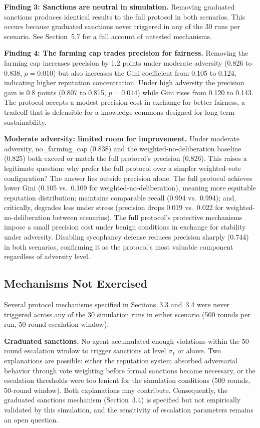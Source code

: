 \documentclass[11pt]{article}
\begin{document}
\textbf{Finding 3: Sanctions are neutral in simulation.} Removing graduated sanctions produces identical results to the full protocol in both scenarios. This occurs because graduated sanctions never triggered in any of the 30 runs per scenario. See Section~5.7 for a full account of untested mechanisms.

\textbf{Finding 4: The farming cap trades precision for fairness.} Removing the farming cap increases precision by 1.2 points under moderate adversity (0.826 to 0.838, $p = 0.010$) but also increases the Gini coefficient from 0.105 to 0.124, indicating higher reputation concentration. Under high adversity the precision gain is 0.8 points (0.807 to 0.815, $p = 0.014$) while Gini rises from 0.120 to 0.143. The protocol accepts a modest precision cost in exchange for better fairness, a tradeoff that is defensible for a knowledge commons designed for long-term sustainability.

\textbf{Moderate adversity: limited room for improvement.} Under moderate adversity, no\_farming\_cap (0.838) and the weighted-no-deliberation baseline (0.825) both exceed or match the full protocol's precision (0.826). This raises a legitimate question: why prefer the full protocol over a simpler weighted-vote configuration? The answer lies outside precision alone. The full protocol achieves lower Gini (0.105 vs.\ 0.109 for weighted-no-deliberation), meaning more equitable reputation distribution; maintains comparable recall (0.994 vs.\ 0.994); and, critically, degrades less under stress (precision drops 0.019 vs.\ 0.022 for weighted-no-deliberation between scenarios). The full protocol's protective mechanisms impose a small precision cost under benign conditions in exchange for stability under adversity. Disabling sycophancy defense reduces precision sharply (0.744) in both scenarios, confirming it as the protocol's most valuable component regardless of adversity level.

\subsection{Mechanisms Not Exercised}

Several protocol mechanisms specified in Sections~3.3 and~3.4 were never triggered across any of the 30 simulation runs in either scenario (500 rounds per run, 50-round escalation window).

\textbf{Graduated sanctions.} No agent accumulated enough violations within the 50-round escalation window to trigger sanctions at level $\sigma_1$ or above. Two explanations are possible: either the reputation system absorbed adversarial behavior through vote weighting before formal sanctions became necessary, or the escalation thresholds were too lenient for the simulation conditions (500 rounds, 50-round window). Both explanations may contribute. Consequently, the graduated sanctions mechanism (Section~3.4) is specified but not empirically validated by this simulation, and the sensitivity of escalation parameters remains an open question.
\end{document}
